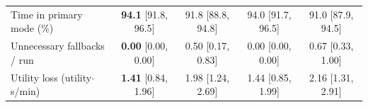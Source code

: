 \begin{table}[t]
\begin{tabular}{lcccc}
\quad Time in primary mode (\%) & \textbf{94.1} {\scriptsize[91.8, 96.5]} & 91.8 {\scriptsize[88.8, 94.8]} & 94.0 {\scriptsize[91.7, 96.5]} & 91.0 {\scriptsize[87.9, 94.5]} \\
\quad Unnecessary fallbacks / run & \textbf{0.00} {\scriptsize[0.00, 0.00]} & 0.50 {\scriptsize[0.17, 0.83]} & 0.00 {\scriptsize[0.00, 0.00]} & 0.67 {\scriptsize[0.33, 1.00]} \\
\quad Utility loss (utility$\cdot$s/min) & \textbf{1.41} {\scriptsize[0.84, 1.96]} & 1.98 {\scriptsize[1.24, 2.69]} & 1.44 {\scriptsize[0.85, 1.99]} & 2.16 {\scriptsize[1.31, 2.91]} \\
\bottomrule
\end{tabular}
\end{table}

